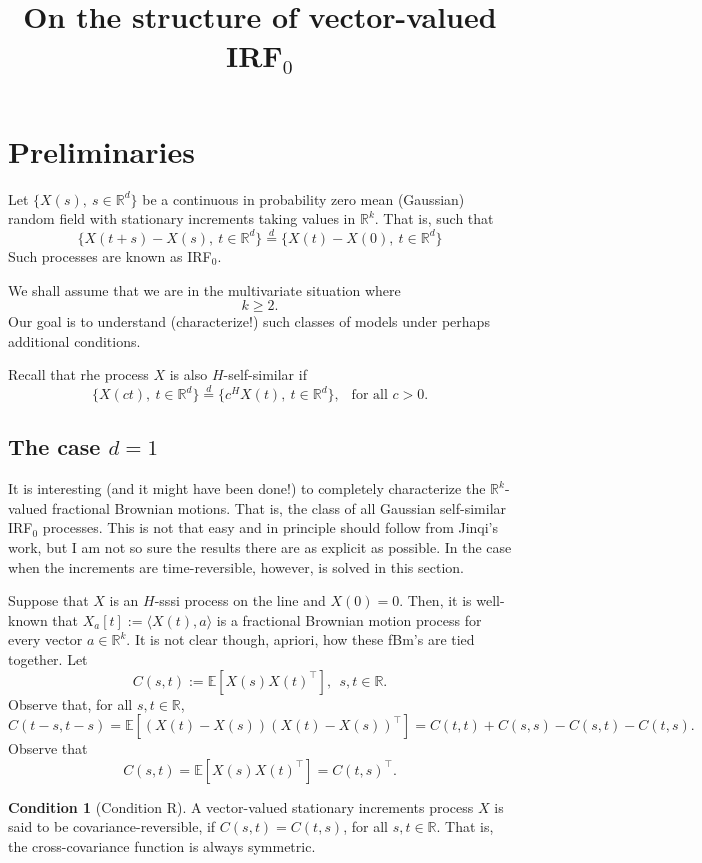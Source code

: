 \documentclass[11pt]{article}
\title{On the structure of vector-valued IRF$_0$}
\def\E{\mathbb E}
\def\R{\mathbb R}
\def\Rd{\R^d}
\def\eqd{\stackrel{d}{=}}
\theoremstyle{plain}
\theoremstyle{definition}
\theoremstyle{condition}
\newtheorem{condition}[theorem]{Condition}
\theoremstyle{remark}
\begin{document}
\maketitle

\section{Preliminaries}

Let $\{X(s),\ s\in \Rd\}$ be a continuous in probability zero mean (Gaussian) random field with stationary increments taking values
in $\R^k$.
That is, such that 
$$
\{X(t+s)-X(s),\ t\in\Rd\}\eqd \{X(t) - X(0),\ t\in\Rd\}
$$
Such processes are known as IRF$_0$.

 We shall assume that we are in the multivariate situation where
$$
k\ge 2.
$$
Our goal is to understand (characterize!) such classes of models under perhaps additional conditions.

Recall that rhe process $X$ is also $H$-self-similar if
$$
\{X(ct),\ t\in\Rd\} \eqd \{ c^H X(t),\ t\in\Rd\},\ \ \mbox{ for all }c>0.
$$


\subsection{The case $d=1$}

It is interesting (and it might have been done!) to completely characterize the $\R^k$-valued fractional Brownian motions.  That is, the
class of all Gaussian self-similar IRF$_{0}$ processes.  This is not that easy and in principle should follow from Jinqi's work, but I am not so 
sure the results there are as explicit as possible.  In the case when the increments are time-reversible, however, is solved in this section.

Suppose that $X$ is an $H$-sssi process on the line and $X(0) = 0$.  Then, it is well-known that
$X_a[t] := \langle X(t),a\rangle$ is a fractional Brownian motion process for every vector $a\in\R^k$.  It is not clear though,
apriori, how these fBm's are tied together.  Let
$$
C(s,t) := \E [ X(s) X(t)^\top],\ \ s,t\in\R. 
$$
Observe that, for all $s,t\in\R$,
\begin{equation}\label{e:c-cov}
C(t-s,t-s) = \E [ (X(t) - X(s)) (X(t)-X(s))^\top] = C(t,t) + C(s,s) -C(s,t) - C(t,s).
\end{equation}
Observe that
$$
C(s,t)= \E[ X(s)X(t)^\top] = C(t,s)^\top.
$$

\begin{condition}[Condition R] \label{co:condtion-R}
A vector-valued stationary increments process $X$ is said to be covariance-reversible, if $C(s,t) = C(t,s)$, for all $s,t\in\R$.  That is,
the cross-covariance function is always symmetric.  
\end{condition}
\end{document}

